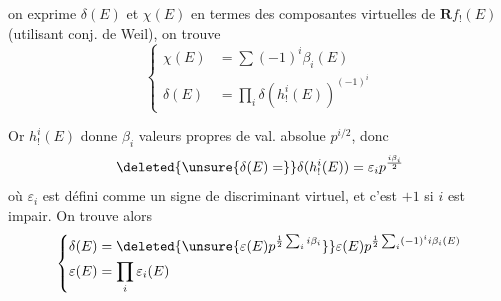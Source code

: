  on exprime $\delta(E)$ et $\chi(E)$ en termes des  composantes virtuelles de $\mathbf R f_!(E)$ (utilisant conj. de Weil), on trouve
\[
\left\{\begin{aligned}
\chi(E)&=\sum(-1)^i\beta_i(E)\\
\delta(E)&=\prod_i\delta(h_!^i(E))^{(-1)^i}
\end{aligned}\right.
\]

Or $h_!^i(E)$ donne $\beta_i$ valeurs propres de val. absolue $p^{i/2}$, donc
\[\deleted{\unsure{\delta(E)=}}\delta(h_!^i(E))=\varepsilon_i p^{\frac{i\beta_i}{2}}\]
où \deleted{$\unsure{\delta}$} $\varepsilon_i$ est défini comme un signe de discriminant virtuel, et c'est \deleted{$\unsure{\varepsilon}$} $+1$ si $i$ est impair. On trouve alors
\[
\left\{\begin{aligned}
\delta(E)&=\deleted{\unsure{\varepsilon(E)p^{\frac12\sum_i i\beta_i}}}\varepsilon(E)p^{\frac12\sum_i(-1)^i i\beta_i(E)}\\
\varepsilon(E)&=\prod_i\varepsilon_i(E)
\end{aligned}\right.
\]
